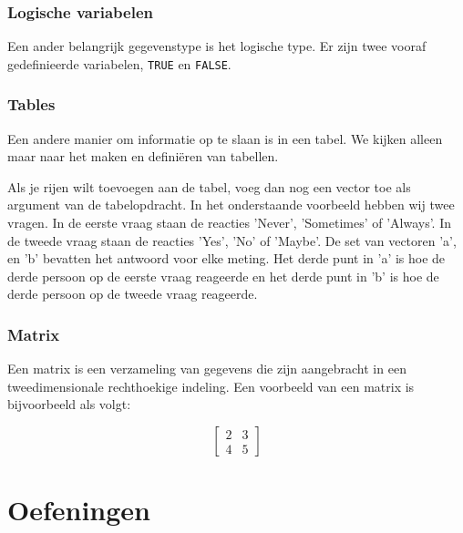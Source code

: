 

\subsubsection{Logische variabelen}

Een ander belangrijk gegevenstype is het logische type. Er zijn twee vooraf gedefinieerde variabelen, \texttt{TRUE} en \texttt{FALSE}.

\subsubsection{Tables}

Een andere  manier om informatie op te slaan is in een tabel.  We kijken alleen maar naar het maken en defini\"eren van tabellen.



Als je rijen wilt toevoegen aan de tabel, voeg dan nog een vector toe als argument van de tabelopdracht. In het onderstaande voorbeeld hebben wij twee vragen. In de eerste vraag staan de reacties  'Never', 'Sometimes' of 'Always'. In de tweede vraag staan de reacties 'Yes', 'No' of 'Maybe'. De set van vectoren 'a', en 'b' bevatten het antwoord voor elke meting. Het derde punt in 'a' is hoe de derde persoon op de eerste vraag reageerde en het derde punt in 'b' is hoe de derde persoon op de tweede vraag reageerde.



\subsubsection{Matrix}

Een matrix is een verzameling van gegevens die zijn aangebracht in een tweedimensionale rechthoekige indeling. Een voorbeeld van een matrix is bijvoorbeeld als volgt:

\[
\begin{bmatrix}
2 & 3 \\
4 & 5
\end{bmatrix}
\]



\section{Oefeningen}

